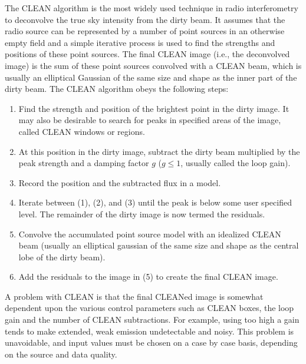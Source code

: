 The CLEAN algorithm \citep{hogbom_1974, schwarz_1978, cornwell_1999} is the most widely used technique in radio interferometry to deconvolve the true sky intensity from the dirty beam. It assumes that the radio source can be represented by a number of point sources in an otherwise empty field and a simple iterative process is used to find the strengths and positions of these point sources. The final CLEAN image (i.e., the deconvolved image) is the sum of these point sources convolved with a CLEAN beam, which is usually an elliptical Gaussian of the same size and shape as the inner part of the dirty beam. The CLEAN algorithm obeys the following steps:
\begin{enumerate}
\item Find the strength and position of the brightest point in the dirty image. It may also be desirable to search for peaks in specified areas of the image, called CLEAN windows or regions.
\item At this position in the dirty image, subtract the dirty beam multiplied by the peak strength and a damping factor $g$ ($g \le 1$, usually called the loop gain).
\item Record the position and the subtracted flux in a model.
\item Iterate between (1), (2), and (3) until the peak is below some user specified level. The remainder of the dirty image is now  termed the residuals.
\item Convolve the accumulated point source model with an idealized CLEAN beam (usually an elliptical gaussian of the same size and shape as the central lobe of the dirty beam).
\item Add the residuals to the image in (5) to create the final CLEAN image.
\end{enumerate}
A problem with CLEAN is that the final CLEANed image is somewhat dependent upon the various control parameters such as CLEAN boxes, the loop gain and the number of CLEAN subtractions. For example, using too high a gain tends to make extended, weak emission undetectable and noisy. This problem is unavoidable, and input values must be chosen on a case by case basis, depending on the source and data quality.

